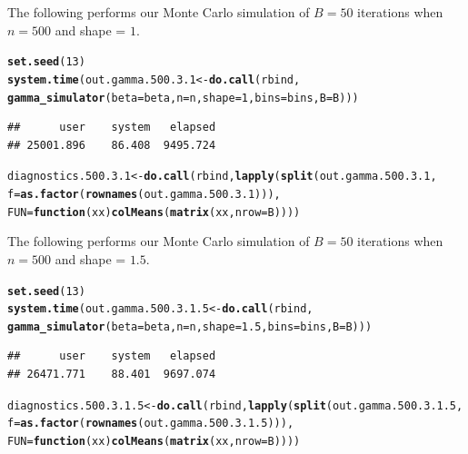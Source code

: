 \documentclass[11pt]{article}\usepackage[]{graphicx}\usepackage[]{color}
\makeatletter
\newcommand{\hlnum}[1]{\textcolor[rgb]{0.686,0.059,0.569}{#1}}%
\newcommand{\hlstd}[1]{\textcolor[rgb]{0.345,0.345,0.345}{#1}}%
\newcommand{\hlkwa}[1]{\textcolor[rgb]{0.161,0.373,0.58}{\textbf{#1}}}%
\newcommand{\hlkwb}[1]{\textcolor[rgb]{0.69,0.353,0.396}{#1}}%
\newcommand{\hlkwc}[1]{\textcolor[rgb]{0.333,0.667,0.333}{#1}}%
\newcommand{\hlkwd}[1]{\textcolor[rgb]{0.737,0.353,0.396}{\textbf{#1}}}%
\newenvironment{kframe}{%
 \def\at@end@of@kframe{}%
 \ifinner\ifhmode%
  \def\at@end@of@kframe{\end{minipage}}%
  \begin{minipage}{\columnwidth}%
 \fi\fi%
 \def\FrameCommand##1{\hskip\@totalleftmargin \hskip-\fboxsep
 \colorbox{shadecolor}{##1}\hskip-\fboxsep
     \hskip-\linewidth \hskip-\@totalleftmargin \hskip\columnwidth}%
 \MakeFramed {\advance\hsize-\width
   \@totalleftmargin\z@ \linewidth\hsize
   \@setminipage}}%
 {\par\unskip\endMakeFramed%
 \at@end@of@kframe}
\newenvironment{knitrout}{}{} %
\makeatother
\begin{document}
The following performs our Monte Carlo simulation of $B = 50$ iterations 
when $n = 500$ and shape = $1$.

\begin{knitrout}
\color{fgcolor}\begin{kframe}
\begin{alltt}
\hlkwd{set.seed}\hlstd{(}\hlnum{13}\hlstd{)}
\hlkwd{system.time}\hlstd{(out.gamma.500.3.1} \hlkwb{<-} \hlkwd{do.call}\hlstd{(rbind,}
  \hlkwd{gamma_simulator}\hlstd{(}\hlkwc{beta} \hlstd{= beta,} \hlkwc{n} \hlstd{= n,} \hlkwc{shape} \hlstd{=} \hlnum{1}\hlstd{,} \hlkwc{bins} \hlstd{= bins,} \hlkwc{B} \hlstd{= B)))}
\end{alltt}
\begin{verbatim}
##      user    system   elapsed 
## 25001.896    86.408  9495.724
\end{verbatim}
\begin{alltt}
\hlstd{diagnostics.500.3.1} \hlkwb{<-} \hlkwd{do.call}\hlstd{(rbind,} \hlkwd{lapply}\hlstd{(}\hlkwd{split}\hlstd{(out.gamma.500.3.1,}
  \hlkwc{f} \hlstd{=} \hlkwd{as.factor}\hlstd{(}\hlkwd{rownames}\hlstd{(out.gamma.500.3.1))),}
  \hlkwc{FUN} \hlstd{=} \hlkwa{function}\hlstd{(}\hlkwc{xx}\hlstd{)} \hlkwd{colMeans}\hlstd{(}\hlkwd{matrix}\hlstd{(xx,} \hlkwc{nrow} \hlstd{= B))))}
\end{alltt}
\end{kframe}
\end{knitrout}


The following performs our Monte Carlo simulation of $B = 50$ iterations 
when $n = 500$ and shape = $1.5$.

\begin{knitrout}
\color{fgcolor}\begin{kframe}
\begin{alltt}
\hlkwd{set.seed}\hlstd{(}\hlnum{13}\hlstd{)}
\hlkwd{system.time}\hlstd{(out.gamma.500.3.1.5} \hlkwb{<-} \hlkwd{do.call}\hlstd{(rbind,}
  \hlkwd{gamma_simulator}\hlstd{(}\hlkwc{beta} \hlstd{= beta,} \hlkwc{n} \hlstd{= n,} \hlkwc{shape} \hlstd{=} \hlnum{1.5}\hlstd{,} \hlkwc{bins} \hlstd{= bins,} \hlkwc{B} \hlstd{= B)))}
\end{alltt}
\begin{verbatim}
##      user    system   elapsed 
## 26471.771    88.401  9697.074
\end{verbatim}
\begin{alltt}
\hlstd{diagnostics.500.3.1.5} \hlkwb{<-} \hlkwd{do.call}\hlstd{(rbind,} \hlkwd{lapply}\hlstd{(}\hlkwd{split}\hlstd{(out.gamma.500.3.1.5,}
  \hlkwc{f} \hlstd{=} \hlkwd{as.factor}\hlstd{(}\hlkwd{rownames}\hlstd{(out.gamma.500.3.1.5))),}
  \hlkwc{FUN} \hlstd{=} \hlkwa{function}\hlstd{(}\hlkwc{xx}\hlstd{)} \hlkwd{colMeans}\hlstd{(}\hlkwd{matrix}\hlstd{(xx,} \hlkwc{nrow} \hlstd{= B))))}
\end{alltt}
\end{kframe}
\end{knitrout}
\end{document}
